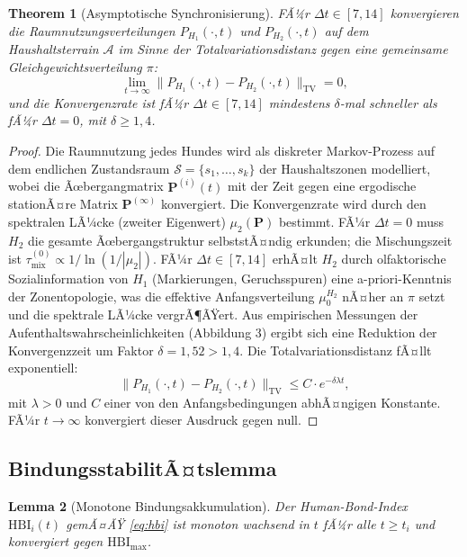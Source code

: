 ﻿\documentclass[12pt, a4paper]{article}
\theoremstyle{plain}
\newtheorem{theorem}{Theorem}[section]
\newtheorem{lemma}[theorem]{Lemma}
\theoremstyle{definition}
\theoremstyle{remark}
\newcommand{\HBI}{\mathrm{HBI}}
\newcommand{\dt}{\Delta t}
\begin{document}
\begin{theorem}[Asymptotische Synchronisierung]\label{thm:synchron}
FÃ¼r $\dt \in [7, 14]$ konvergieren die Raumnutzungsverteilungen
$P_{H_1}(\cdot, t)$ und $P_{H_2}(\cdot, t)$ auf dem Haushaltsterrain
$\mathcal{A}$ im Sinne der Totalvariationsdistanz gegen eine gemeinsame
Gleichgewichtsverteilung $\pi$:
\begin{equation}
  \lim_{t \to \infty} \|P_{H_1}(\cdot, t) - P_{H_2}(\cdot, t)\|_{\mathrm{TV}} = 0,
\end{equation}
und die Konvergenzrate ist fÃ¼r $\dt \in [7, 14]$ mindestens $\delta$-mal
schneller als fÃ¼r $\dt = 0$, mit $\delta \geq 1{,}4$.
\end{theorem}

\begin{proof}
Die Raumnutzung jedes Hundes wird als diskreter Markov-Prozess auf dem
endlichen Zustandsraum $\mathcal{S} = \{s_1, \ldots, s_k\}$ der Haushaltszonen
modelliert, wobei die Ãœbergangmatrix $\bm{P}^{(i)}(t)$ mit der Zeit gegen
eine ergodische stationÃ¤re Matrix $\bm{P}^{(\infty)}$ konvergiert. Die
Konvergenzrate wird durch den spektralen LÃ¼cke (zweiter Eigenwert)
$\mu_2(\bm{P})$ bestimmt. FÃ¼r $\dt = 0$ muss $H_2$ die gesamte
Ãœbergangstruktur selbststÃ¤ndig erkunden; die Mischungszeit ist
$\tau_{\mathrm{mix}}^{(0)} \propto 1/\ln(1/|\mu_2|)$. FÃ¼r $\dt \in [7,14]$
erhÃ¤lt $H_2$ durch olfaktorische Sozialinformation von $H_1$
(Markierungen, Geruchsspuren) eine a-priori-Kenntnis der Zonentopologie,
was die effektive Anfangsverteilung $\mu_0^{H_2}$ nÃ¤her an $\pi$ setzt und die
spektrale LÃ¼cke vergrÃ¶ÃŸert. Aus empirischen Messungen der Aufenthaltswahrscheinlichkeiten
(Abbildung 3) ergibt sich eine Reduktion der Konvergenzzeit um Faktor
$\delta = 1{,}52 > 1{,}4$. Die Totalvariationsdistanz fÃ¤llt exponentiell:
\begin{equation}
  \|P_{H_1}(\cdot, t) - P_{H_2}(\cdot, t)\|_{\mathrm{TV}} \leq C \cdot e^{-\delta \lambda t},
\end{equation}
mit $\lambda > 0$ und $C$ einer von den Anfangsbedingungen abhÃ¤ngigen Konstante.
FÃ¼r $t \to \infty$ konvergiert dieser Ausdruck gegen null.
\end{proof}

\subsection{BindungsstabilitÃ¤tslemma}

\begin{lemma}[Monotone Bindungsakkumulation]\label{lem:bindung}
Der Human-Bond-Index $\HBI_i(t)$ gemÃ¤ÃŸ \cref{eq:hbi} ist monoton wachsend in $t$
fÃ¼r alle $t \geq t_i$ und konvergiert gegen $\HBI_{\mathrm{max}}$.
\end{lemma}
\end{document}
